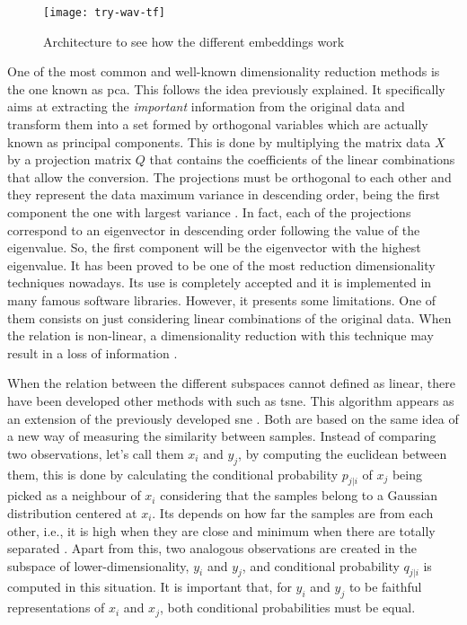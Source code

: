 	\begin{wrapfigure}{R}{0.4\textwidth}
		\centering
		\captionsetup{justification=centering}
		\texttt{[image: try-wav-tf]}
		\caption{Architecture to see how the different embeddings work}
		\label{fig:mesh5}
	\end{wrapfigure}
	
	One of the most common and well-known dimensionality reduction methods is the one known as \acrfull{pca}. This follows the idea previously explained. It specifically aims at extracting the \textit{important} information from the original data and transform them into a set formed by orthogonal variables which are actually known as principal components. This is done by multiplying the matrix data $X$ by a projection matrix $Q$ that contains the coefficients of the linear combinations that allow the conversion. The projections must be orthogonal to each other and they represent the data maximum variance in descending order, being the first component the one with largest variance \cite{Abdi2010}. In fact, each of the projections correspond to an eigenvector in descending order following the value of the eigenvalue. So, the first component will be the eigenvector with the highest eigenvalue. It has been proved to be one of the most reduction dimensionality techniques nowadays. Its use is completely accepted and it is implemented in many famous software libraries. However, it presents some limitations. One of them consists on just considering linear combinations of the original data. When the relation is non-linear, a dimensionality reduction with this technique may result in a loss of information \cite{AmatRodrigo2017}. 
	
	When the relation between the different subspaces cannot defined as linear, there have been developed other methods with such as \acrfull{tsne}. This algorithm appears as an extension of the previously developed \acrfull{sne} \cite{Hinton2003}. Both are based on the same idea of a new way of measuring the similarity between samples. Instead of comparing two observations, let's call them $x_i$ and $y_j$, by computing the euclidean between them, this is done by calculating the conditional probability $p_{j|i}$ of $x_j$ being picked as a neighbour of $x_i$ considering that the samples belong to a Gaussian distribution centered at $x_i$. Its depends on how far the samples are from each other, i.e., it is high when they are close and minimum when there are totally separated \cite{VanDerMaaten2008}. Apart from this, two analogous observations are created in the subspace of lower-dimensionality, $y_i$ and $y_j$, and conditional probability $q_{j|i}$ is computed in this situation. It is important that, for $y_i$ and $y_j$ to be faithful representations of $x_i$ and $x_j$, both conditional probabilities must be equal.
	
